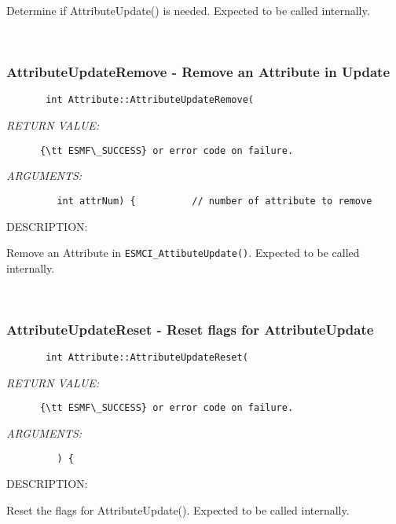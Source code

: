       Determine if AttributeUpdate() is needed. 
      Expected to be called internally.
   
 
\mbox{}\hrulefill\
 
\subsubsection [AttributeUpdateRemove] {AttributeUpdateRemove - Remove an Attribute in Update}


  
\begin{verbatim}       int Attribute::AttributeUpdateRemove(\end{verbatim}{\em RETURN VALUE:}
\begin{verbatim}      {\tt ESMF\_SUCCESS} or error code on failure.\end{verbatim}{\em ARGUMENTS:}
\begin{verbatim}         int attrNum) {          // number of attribute to remove\end{verbatim}
{\sf DESCRIPTION:\\ }


      Remove an Attribute in {\tt ESMCI\_AttibuteUpdate()}.
      Expected to be called internally.
   
 
\mbox{}\hrulefill\
 
\subsubsection [AttributeUpdateReset] {AttributeUpdateReset - Reset flags for AttributeUpdate}


  
\begin{verbatim}       int Attribute::AttributeUpdateReset(\end{verbatim}{\em RETURN VALUE:}
\begin{verbatim}      {\tt ESMF\_SUCCESS} or error code on failure.\end{verbatim}{\em ARGUMENTS:}
\begin{verbatim}         ) { \end{verbatim}
{\sf DESCRIPTION:\\ }


      Reset the flags for AttributeUpdate().
      Expected to be called internally.
  
\setlength{\parskip}{\oldparskip}
\setlength{\parindent}{\oldparindent}
\setlength{\baselineskip}{\oldbaselineskip}
